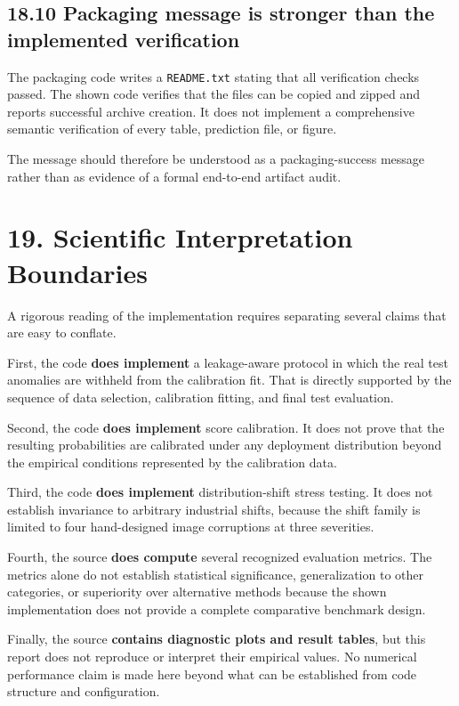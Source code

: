 \documentclass[
  11pt,
]{article}
\begin{document}
\subsection{18.10 Packaging message is stronger than the implemented
verification}\label{packaging-message-is-stronger-than-the-implemented-verification}

The packaging code writes a \texttt{README.txt} stating that all
verification checks passed. The shown code verifies that the files can
be copied and zipped and reports successful archive creation. It does
not implement a comprehensive semantic verification of every table,
prediction file, or figure.

The message should therefore be understood as a packaging-success
message rather than as evidence of a formal end-to-end artifact audit.

\section{19. Scientific Interpretation
Boundaries}\label{scientific-interpretation-boundaries}

A rigorous reading of the implementation requires separating several
claims that are easy to conflate.

First, the code \textbf{does implement} a leakage-aware protocol in
which the real test anomalies are withheld from the calibration fit.
That is directly supported by the sequence of data selection,
calibration fitting, and final test evaluation.

Second, the code \textbf{does implement} score calibration. It does not
prove that the resulting probabilities are calibrated under any
deployment distribution beyond the empirical conditions represented by
the calibration data.

Third, the code \textbf{does implement} distribution-shift stress
testing. It does not establish invariance to arbitrary industrial
shifts, because the shift family is limited to four hand-designed image
corruptions at three severities.

Fourth, the source \textbf{does compute} several recognized evaluation
metrics. The metrics alone do not establish statistical significance,
generalization to other categories, or superiority over alternative
methods because the shown implementation does not provide a complete
comparative benchmark design.

Finally, the source \textbf{contains diagnostic plots and result
tables}, but this report does not reproduce or interpret their empirical
values. No numerical performance claim is made here beyond what can be
established from code structure and configuration.
\end{document}
